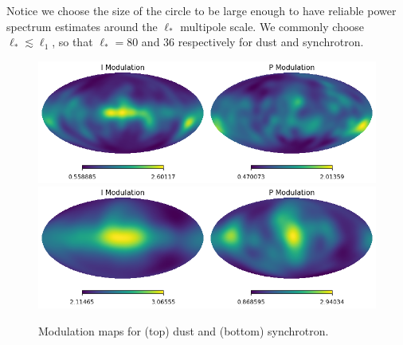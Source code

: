  
Notice we choose the size of the circle to be large enough to have reliable power spectrum estimates around the $\ell_* $ multipole scale. We commonly choose  $\ell_*\lesssim \ell_1$, so that $\ell_*=80$ and $36$ respectively for dust and synchrotron. 
 
 \begin{figure}
     \centering
     \includegraphics[width=2\columnwidth]{figures/mod_dust.png}\\
     
      \includegraphics[width=2\columnwidth]{figures/mod_synch.png}\\
     \caption{Modulation maps for (top) dust and  (bottom) synchrotron. }
     \label{fig:modulation_maps }
 \end{figure}
 

